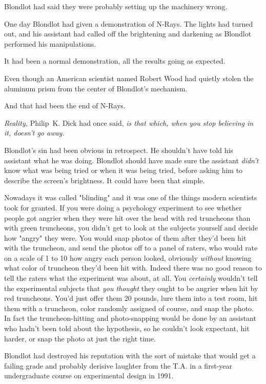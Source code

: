 Blondlot had said they were probably setting up the machinery wrong.

One day Blondlot had given a demonstration of N-Rays. The lights had turned
out, and his assistant had called off the brightening and darkening as Blondlot
performed his manipulations.

It had been a normal demonstration, all the results going as expected.

Even though an American scientist named Robert Wood had quietly stolen the
aluminum prism from the center of Blondlot's mechanism.

And that had been the end of N-Rays.

\emph{Reality,} Philip~K. Dick had once said, \emph{is that which, when you
stop believing in it, doesn't go away.}

Blondlot's sin had been obvious in retrospect. He shouldn't have told his
assistant what he was doing. Blondlot should have made sure the assistant
\emph{didn't} know what was being tried or when it was being tried, before
asking him to describe the screen's brightness. It could have been that simple.

Nowadays it was called "blinding" and it was one of the things modern
scientists took for granted. If you were doing a psychology experiment to see
whether people got angrier when they were hit over the head with red truncheons
than with green truncheons, you didn't get to look at the subjects yourself and
decide how "angry" they were. You would snap photos of them after they'd been
hit with the truncheon, and send the photos off to a panel of raters, who would
rate on a scale of 1 to 10 how angry each person looked, obviously
\emph{without} knowing what color of truncheon they'd been hit with. Indeed
there was no good reason to tell the raters what the experiment was about, at
all. You \emph{certainly} wouldn't tell the experimental subjects that
\emph{you thought} they ought to be angrier when hit by red truncheons. You'd
just offer them 20 pounds, lure them into a test room, hit them with a
truncheon, color randomly assigned of course, and snap the photo. In fact the
truncheon-hitting and photo-snapping would be done by an assistant who hadn't
been told about the hypothesis, so he couldn't look expectant, hit harder, or
snap the photo at just the right time.

Blondlot had destroyed his reputation with the sort of mistake that would get a
failing grade and probably derisive laughter from the T.A. in a first-year
undergraduate course on experimental design{\el} in 1991.

